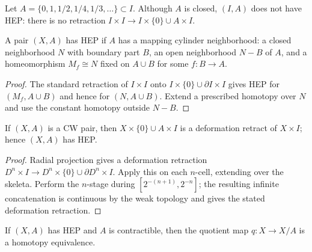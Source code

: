 \begin{example}
\label{ex:hep-fails-for-bad-subspace}
Let $A=\{0,1,1/2,1/4,1/3,\ldots\}\subset I$. Although $A$ is closed, $(I,A)$
does not have HEP: there is no retraction
$I\times I\to I\times\{0\}\cup A\times I$.
\end{example}

\begin{example}
\label{ex:mapping-cylinder-neighborhood-hep}
A pair $(X,A)$ has HEP if $A$ has a mapping cylinder neighborhood: a closed
neighborhood $N$ with boundary part $B$, an open neighborhood $N-B$ of $A$, and a
homeomorphism $M_f\cong N$ fixed on $A\cup B$ for some $f:B\to A$.
\end{example}

\begin{proof}
\sketch The standard retraction of $I\times I$ onto
$I\times\{0\}\cup\partial I\times I$ gives HEP for $(M_f,A\cup B)$ and hence for
$(N,A\cup B)$. Extend a prescribed homotopy over $N$ and use the constant homotopy
outside $N-B$.
\end{proof}

\begin{proposition}
\label{prop:cw-pairs-have-hep}
\leanok
{}
If $(X,A)$ is a CW pair, then
$X\times\{0\}\cup A\times I$ is a deformation retract of $X\times I$; hence
$(X,A)$ has HEP.
\end{proposition}

\begin{proof}
\leanok
\sketch Radial projection gives a deformation retraction
$D^n\times I\to D^n\times\{0\}\cup\partial D^n\times I$. Apply this on each
$n$-cell, extending over the skeleta. Perform the $n$-stage during
$[2^{-(n+1)},2^{-n}]$; the resulting infinite concatenation is continuous by the
weak topology and gives the stated deformation retraction.
\end{proof}

\begin{proposition}
\label{prop:quotient-by-contractible-hep-homotopy-equiv}
\leanok
{}
If $(X,A)$ has HEP and $A$ is contractible, then the quotient map $q:X\to X/A$ is
a homotopy equivalence.
\end{proposition}

